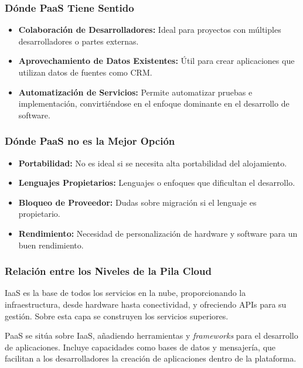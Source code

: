 \documentclass{article}
\begin{document}
\subsubsection*{Dónde PaaS Tiene Sentido}

\begin{itemize}
    \item \textbf{Colaboración de Desarrolladores:} Ideal para proyectos con múltiples desarrolladores o partes externas.
    \item \textbf{Aprovechamiento de Datos Existentes:} Útil para crear aplicaciones que utilizan datos de fuentes como CRM.
    \item \textbf{Automatización de Servicios:} Permite automatizar pruebas e implementación, convirtiéndose en el enfoque dominante en el desarrollo de software.
\end{itemize}

\subsubsection*{Dónde PaaS no es la Mejor Opción}

\begin{itemize}
    \item \textbf{Portabilidad:} No es ideal si se necesita alta portabilidad del alojamiento.
    \item \textbf{Lenguajes Propietarios:} Lenguajes o enfoques que dificultan el desarrollo.
    \item \textbf{Bloqueo de Proveedor:} Dudas sobre migración si el lenguaje es propietario.
    \item \textbf{Rendimiento:} Necesidad de personalización de hardware y software para un buen rendimiento.
\end{itemize}

\subsubsection{Relación entre los Niveles de la Pila Cloud}

IaaS es la base de todos los servicios en la nube, proporcionando la infraestructura, desde hardware hasta conectividad, y ofreciendo APIs para su gestión. Sobre esta capa se construyen los servicios superiores.

PaaS se sitúa sobre IaaS, añadiendo herramientas y \textit{frameworks} para el desarrollo de aplicaciones. Incluye capacidades como bases de datos y mensajería, que facilitan a los desarrolladores la creación de aplicaciones dentro de la plataforma.
\end{document}
